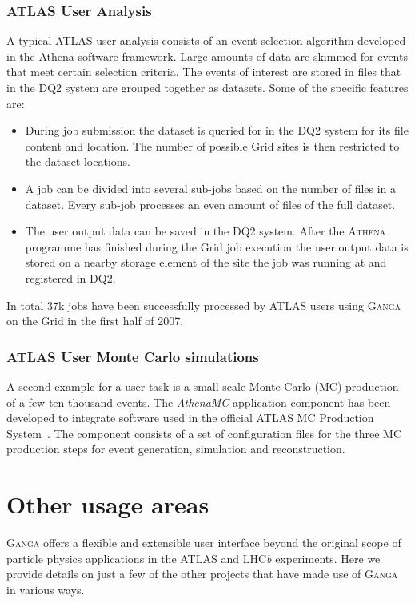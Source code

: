 \documentclass{elsart}
\def\lhcb {LHC{\em b\/}\xspace}
\def\atlas {ATLAS\xspace}
\def\ganga {\textsc{Ganga}\xspace}
\def\athena {\textsc{Athena}\xspace}
\def\grid {Grid\xspace}
\begin{document}
\subsubsection{\atlas User Analysis}
A typical \atlas user analysis consists of an event selection algorithm
developed in the Athena software framework. Large amounts of data are skimmed
for events that meet certain selection criteria. The events of interest are
stored in files that in the DQ2 system are grouped together as datasets. Some
of the specific features are:
\begin{itemize}
\item During job submission the dataset is queried for in the DQ2 system for
  its file content and location.  The number of possible \grid sites is then
  restricted to the dataset locations.
\item A job can be divided into several sub-jobs based on the number of files
  in a dataset. Every sub-job processes an even amount of files of the full
  dataset.
\item The user output data can be saved in the DQ2 system. After the \athena
  programme has finished during the \grid job execution the user output data
  is stored on a nearby storage element of the site the job was running at
  and registered in DQ2.
\end{itemize}

In total 37k jobs have been successfully processed by \atlas users using
\ganga on the \grid in the first half of 2007.

\subsubsection{\atlas User Monte Carlo simulations}
A second example for a user task is a small scale Monte Carlo (MC) production
of a few ten thousand events. The \emph{AthenaMC} application component has
been developed to integrate software used in the official \atlas MC Production
System~\cite{bib:atlasprodsys}.  The component consists of a set of
configuration files for the three MC production steps for event generation,
simulation and reconstruction.

\section{Other usage areas}
\label{sec:other}
\ganga offers a flexible and extensible user interface beyond the original scope of particle physics
applications in the \atlas and \lhcb experiments. Here we provide
details on just a few of the other projects that have made use of \ganga in
various ways.
\end{document}

